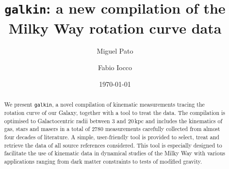 \documentclass[twocolumn,prd,reprint,preprintnumbers,amsmath,amssymb,superscriptaddress,nofootinbib]{revtex4}
\begin{document}
\title{\texttt{galkin}: a new compilation of the Milky Way rotation curve data}

\author{Miguel Pato}

\author{Fabio Iocco}




\date{\today}%

\begin{abstract}
We present \texttt{galkin}, a novel compilation of kinematic measurements tracing the rotation curve of our Galaxy, together with a tool to treat the data. The compilation is optimised to Galactocentric radii between $3$ and $20\,$kpc and includes the kinematics of gas, stars and masers in a total of 2780 measurements carefully collected from almost four decades of literature. A simple, user-friendly tool is provided to select, treat and retrieve the data of all source references considered. This tool is especially designed to facilitate the use of kinematic data in dynamical studies of the Milky Way with various applications ranging from dark matter constraints to tests of modified gravity.
\end{abstract}

\maketitle
\end{document}
